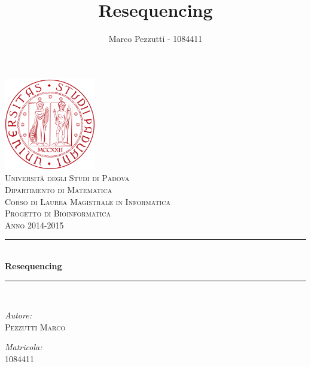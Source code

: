 \documentclass[11pt,a4paper,final]{article}
\author{Marco Pezzutti - 1084411}
\title{Resequencing}
\date{}
\begin{document}
\begin{titlepage}
\begin{center}
\includegraphics[width=40mm]{immagini/Logo_Padova.png}\\[1cm]
\textcolor{redUni}{\textsc{\LARGE Università degli Studi di Padova}}\\[0.5cm]
\textcolor{redUni}{\textsc{\Large Dipartimento di Matematica}}\\[0.5cm]
\textcolor{redUni}{\textsc{\Large Corso di Laurea Magistrale in Informatica}}\\[2cm]
\textsc{\Large Progetto di Bioinformatica}\\[0.5cm]
\textsc{\large Anno 2014-2015} \\[1cm]
\rule{\linewidth}{0.3mm}\\[0.5cm]
{\huge \bfseries Resequencing}\\[0.3cm]
\rule{\linewidth}{0.3mm}\\[1cm]
\begin{minipage}{0.4\textwidth}
	\begin{flushleft}
	\emph{Autore:}\\
	\textsc{\large Pezzutti Marco}\\
	\end{flushleft}
\end{minipage}
\begin{minipage}{0.4\textwidth}
	\begin{flushright}
	\emph{Matricola:}\\
	\textsc{\large 1084411}\\
	\end{flushright}
\end{minipage}
\end{center}
\end{titlepage}

\tableofcontents
\listoffigures
\newpage







\end{document}
